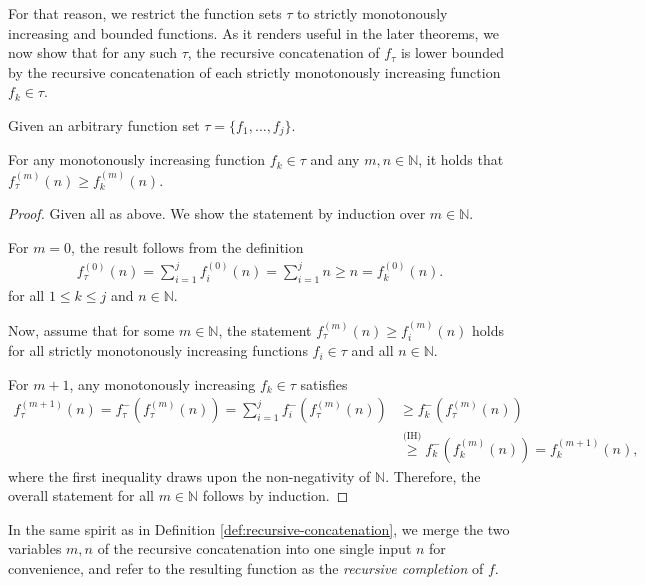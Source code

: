 For that reason, we restrict the function sets $\tau$ to strictly monotonously increasing and bounded functions.
As it renders useful in the later theorems, we now show that for any such $\tau$, the recursive concatenation of $f_{\tau}$ is lower bounded by the recursive concatenation of each strictly monotonously increasing function $f_k\in\tau$.

\begin{lemma}
	\label{lemma:max-bound-recursive-concatenation-sum}
	Given an arbitrary function set $\tau=\{f_1,\dots,f_j\}$.
	
	For any monotonously increasing function $f_k\in\tau$ and any $m,n\in\mathbb{N}$, it holds that
	$f_{\tau}^{(m)}(n)\geq f_k^{(m)}(n)$.
\end{lemma}
\begin{proof}
	Given all as above.
	We show the statement by induction over $m\in\mathbb{N}$.
	
	For $m=0$, the result follows from the definition
	\begin{align*}
		f_{\tau}^{(0)}(n)=\sum_{i=1}^{j} f_{i}^{(0)}(n)=\sum_{i=1}^{j}n\geq n=f_{k}^{(0)}(n).
	\end{align*}
	for all $1\leq k\leq j$ and $n\in\mathbb{N}$.
	
	Now, assume that for some $m\in\mathbb{N}$, the statement $f_{\tau}^{(m)}(n)\geq f_i^{(m)}(n)$ holds for all strictly monotonously increasing functions $f_i\in\tau$ and all $n\in\mathbb{N}$.
	
	For $m+1$, any monotonously increasing $f_k \in \tau$ satisfies
	\begin{align}
		f_{\tau}^{(m+1)}(n) = f_{\tau}^{-}(f_{\tau}^{(m)}(n)) = \sum_{i=1}^{j}f_i^{-}(f_{\tau}^{(m)}(n))
		&\geq f_k^{-}(f_{\tau}^{(m)}(n))\\
		&\overset{\text{(IH)}}{\geq} f_k^{-}( f_k^{(m)}(n)) = f_k^{(m+1)}(n),
	\end{align}
	where the first inequality draws upon the non-negativity of $\mathbb{N}$.
	Therefore, the overall statement for all $m\in\mathbb{N}$ follows by induction.	
	
\end{proof}

In the same spirit as in Definition \ref{def:recursive-concatenation}, we merge the two variables $m,n$ of the recursive concatenation into one single input $n$ for convenience, and refer to the resulting function as the \textit{recursive completion} of $f$.

